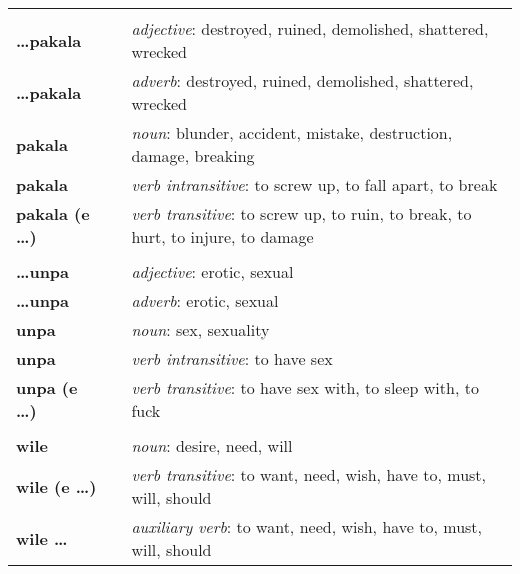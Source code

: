 \begin{supertabular}{p{2,5cm}|ll}
                              &  &                                                                                         \\
    \textbf{\dots pakala}     &  & \textit{adjective}: destroyed, ruined, demolished, shattered, wrecked                   \\
    \textbf{\dots pakala}     &  & \textit{adverb}: destroyed, ruined, demolished, shattered, wrecked                      \\
    \textbf{pakala}           &  & \textit{noun}: blunder, accident, mistake, destruction, damage, breaking                \\
    \textbf{pakala}           &  & \textit{verb intransitive}: to screw up, to fall apart, to break                        \\
    \textbf{pakala (e \dots)} &  & \textit{verb transitive}: to screw up, to ruin, to break, to hurt, to injure, to damage \\
                              &  &                                                                                         \\
    \textbf{\dots unpa}       &  & \textit{adjective}: erotic, sexual                                                      \\
    \textbf{\dots unpa}       &  & \textit{adverb}: erotic, sexual                                                         \\
    \textbf{unpa}             &  & \textit{noun}: sex, sexuality                                                           \\
    \textbf{unpa}             &  & \textit{verb intransitive}: to have sex                                                 \\
    \textbf{unpa (e \dots)}   &  & \textit{verb transitive}: to have sex with, to sleep with, to fuck                      \\
                              &  &                                                                                         \\
    \textbf{wile}             &  & \textit{noun}: desire, need, will                                                       \\
    \textbf{wile (e \dots)}   &  & \textit{verb transitive}: to want, need, wish, have to, must, will, should              \\
    \textbf{wile \dots}       &  & \textit{auxiliary verb}: to want, need, wish, have to, must, will, should               \\
\end{supertabular}

